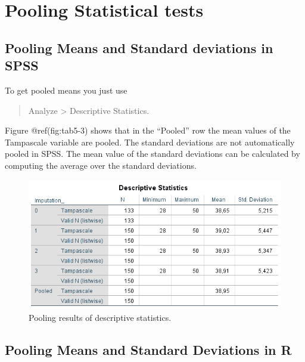\documentclass[
]{book}
\begin{document}
\hypertarget{pooling-statistical-tests}{%
\section{Pooling Statistical tests}\label{pooling-statistical-tests}}

\hypertarget{pooling-means-and-standard-deviations-in-spss}{%
\subsection{Pooling Means and Standard deviations in
SPSS}\label{pooling-means-and-standard-deviations-in-spss}}

To get pooled means you just use

\begin{quote}
Analyze \textgreater{} Descriptive Statistics.
\end{quote}

Figure @ref(fig:tab5-3) shows that in the ``Pooled'' row the mean values
of the Tampascale variable are pooled. The standard deviations are not
automatically pooled in SPSS. The mean value of the standard deviations
can be calculated by computing the average over the standard deviations.

\begin{figure}

{\centering \includegraphics[width=0.9\linewidth]{images/table5.3} 

}

\caption{Pooling results of descriptive statistics.}\label{fig:tab5-3}
\end{figure}

\hypertarget{pooling-means-and-standard-deviations-in-r}{%
\subsection{Pooling Means and Standard Deviations in
R}\label{pooling-means-and-standard-deviations-in-r}}
\end{document}
